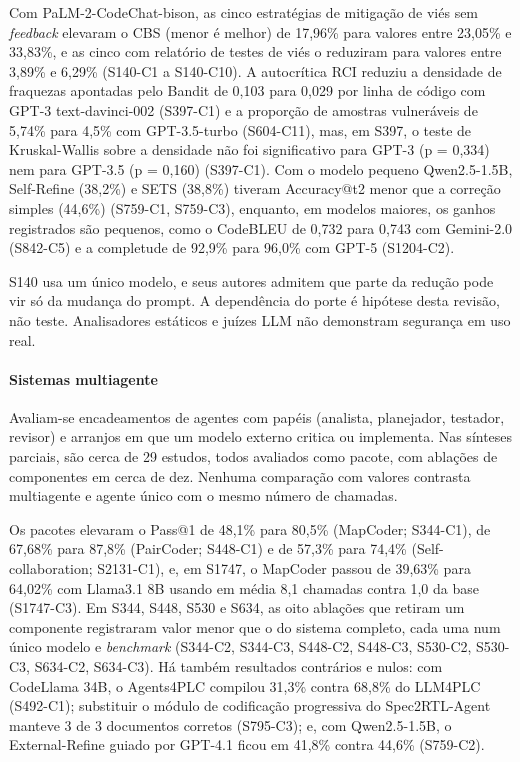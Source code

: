 Com PaLM-2-CodeChat-bison, as cinco estratégias de mitigação de viés sem \textit{feedback} elevaram o CBS (menor é melhor) de 17,96\% para valores entre 23,05\% e 33,83\%, e as cinco com relatório de testes de viés o reduziram para valores entre 3,89\% e 6,29\% (S140-C1 a S140-C10).
A autocrítica RCI reduziu a densidade de fraquezas apontadas pelo Bandit de 0,103 para 0,029 por linha de código com GPT-3 text-davinci-002 (S397-C1) e a proporção de amostras vulneráveis de 5,74\% para 4,5\% com GPT-3.5-turbo (S604-C11), mas, em S397, o teste de Kruskal-Wallis sobre a densidade não foi significativo para GPT-3 (p = 0,334) nem para GPT-3.5 (p = 0,160) (S397-C1).
Com o modelo pequeno Qwen2.5-1.5B, Self-Refine (38,2\%) e SETS (38,8\%) tiveram Accuracy@t2 menor que a correção simples (44,6\%) (S759-C1, S759-C3), enquanto, em modelos maiores, os ganhos registrados são pequenos, como o CodeBLEU de 0,732 para 0,743 com Gemini-2.0 (S842-C5) e a completude de 92,9\% para 96,0\% com GPT-5 (S1204-C2).

S140 usa um único modelo, e seus autores admitem que parte da redução pode vir só da mudança do prompt. A dependência do porte é hipótese desta revisão, não teste. Analisadores estáticos e juízes LLM não demonstram segurança em uso real.

\paragraph{Sistemas multiagente}
Avaliam-se encadeamentos de agentes com papéis (analista, planejador, testador, revisor) e arranjos em que um modelo externo critica ou implementa. Nas sínteses parciais, são cerca de 29 estudos, todos avaliados como pacote, com ablações de componentes em cerca de dez. Nenhuma comparação com valores contrasta multiagente e agente único com o mesmo número de chamadas.

Os pacotes elevaram o Pass@1 de 48,1\% para 80,5\% (MapCoder; S344-C1), de 67,68\% para 87,8\% (PairCoder; S448-C1) e de 57,3\% para 74,4\% (Self-collaboration; S2131-C1), e, em S1747, o MapCoder passou de 39,63\% para 64,02\% com Llama3.1 8B usando em média 8,1 chamadas contra 1,0 da base (S1747-C3).
Em S344, S448, S530 e S634, as oito ablações que retiram um componente registraram valor menor que o do sistema completo, cada uma num único modelo e \textit{benchmark} (S344-C2, S344-C3, S448-C2, S448-C3, S530-C2, S530-C3, S634-C2, S634-C3).
Há também resultados contrários e nulos: com CodeLlama 34B, o Agents4PLC compilou 31,3\% contra 68,8\% do LLM4PLC (S492-C1); substituir o módulo de codificação progressiva do Spec2RTL-Agent manteve 3 de 3 documentos corretos (S795-C3); e, com Qwen2.5-1.5B, o External-Refine guiado por GPT-4.1 ficou em 41,8\% contra 44,6\% (S759-C2).


